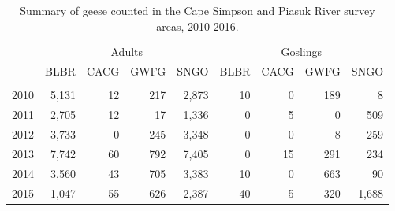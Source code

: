 \documentclass[]{article}
\begin{document}
\makeatletter
\setlength{\@fptop}{0pt} \makeatother

\begin{table}

\caption{\label{tab:Kable_Table3_output}Summary of geese counted in the Cape Simpson and Piasuk River survey areas, 2010-2016.}
\centering
\begin{tabular}[t]{lrrrrrrrr}
\toprule
\multicolumn{1}{c}{} & \multicolumn{4}{c}{Adults} & \multicolumn{4}{c}{Goslings} \\
\cmidrule(l{2pt}r{2pt}){2-5} \cmidrule(l{2pt}r{2pt}){6-9}
 & BLBR & CACG & GWFG & SNGO & BLBR & CACG & GWFG & SNGO\\
\midrule
\addlinespace[0.3em]
\multicolumn{9}{l}{\textbf{Piasuk River}}\\
\hspace{1em}\hspace{1em}\hspace{1em}\hspace{1em}2010 & 5,131 & 12 & 217 & 2,873 & 10 & 0 & 189 & 8\\
\hspace{1em}\hspace{1em}\hspace{1em}\hspace{1em}2011 & 2,705 & 12 & 17 & 1,336 & 0 & 5 & 0 & 509\\
\hspace{1em}\hspace{1em}\hspace{1em}\hspace{1em}2012 & 3,733 & 0 & 245 & 3,348 & 0 & 0 & 8 & 259\\
\hspace{1em}\hspace{1em}\hspace{1em}\hspace{1em}2013 & 7,742 & 60 & 792 & 7,405 & 0 & 15 & 291 & 234\\
\hspace{1em}\hspace{1em}\hspace{1em}\hspace{1em}2014 & 3,560 & 43 & 705 & 3,383 & 10 & 0 & 663 & 90\\
\hspace{1em}\hspace{1em}\hspace{1em}\hspace{1em}2015 & 1,047 & 55 & 626 & 2,387 & 40 & 5 & 320 & 1,688\\

\end{tabular}
\end{table}
\end{document}
